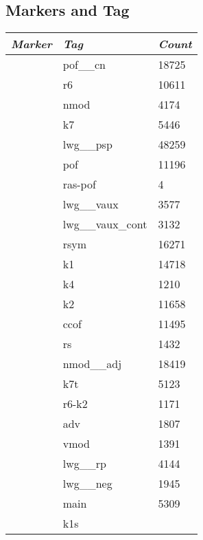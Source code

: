 \documentclass[a4 paper]{article}
\begin{document}
\subsection{Markers and Tag}


\begin{longtable}{cp{}p{}}
    \toprule
    \textit{Marker} & \textit{Tag} & \textit{Count} \\ 
    \toprule
 & pof\_\_cn & 18725\\ \midrule  & r6 & 10611\\ \midrule  & nmod & 4174\\ \midrule  & k7 & 5446\\ \midrule  & lwg\_\_psp & 48259\\ \midrule  & pof & 11196\\ \midrule  & ras-pof & 4\\ \midrule  & lwg\_\_vaux & 3577\\ \midrule  & lwg\_\_vaux\_cont & 3132\\ \midrule  & rsym & 16271\\ \midrule  & k1 & 14718\\ \midrule  & k4 & 1210\\ \midrule  & k2 & 11658\\ \midrule  & ccof & 11495\\ \midrule  & rs & 1432\\ \midrule  & nmod\_\_adj & 18419\\ \midrule  & k7t & 5123\\ \midrule  & r6-k2 & 1171\\ \midrule  & adv & 1807\\ \midrule  & vmod & 1391\\ \midrule  & lwg\_\_rp & 4144\\ \midrule  & lwg\_\_neg & 1945\\ \midrule  & main & 5309\\ \midrule  & k1s
\end{longtable}
\end{document}
